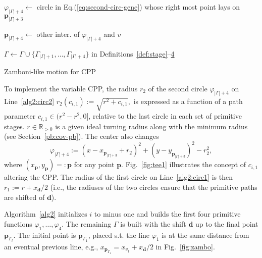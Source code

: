 \documentclass[letterpaper,10pt,journal,twoside]{IEEEtran}
\theoremstyle{definition}
\begin{document}
\begin{algorithm}[t]
\begin{algorithmic}[1]
          \STATE $\varphi_{|\Gamma|+4}\gets$ circle in Eq.\hspace*{.7ex}(\ref{eq:second-circ-gene}) 
          whose right most point lays\vspace*{.3ex} \hspace*{1em}on $\mathbf{p}_{|\Gamma|+3}$\vspace*{.3ex}\label{alg2:circ2}

          \STATE $\mathbf{p}_{|\Gamma|+4}\gets$ other inter. %
          of $\varphi_{|\Gamma|+4}$ and $v$\vspace*{.3ex}\label{alg2:trig4}

          \vspace*{.8ex}
          \STATE $\Gamma\gets\Gamma\cup\{\Gamma_{|\Gamma|+1},\dots,\Gamma_{|\Gamma|+4}\}${ in Definitions~\ref{def:stage}--\hyperref[def:plan]{4}}\label{alg2:last}

        \ENDIF
      \ENDIF
    \ENDFOR
  \end{algorithmic}
  \caption{Zamboni-like motion for CPP}\label{alg2}
\end{algorithm}

To implement the variable CPP, the radius $r_2$ of the second circle $\varphi_{|\Gamma|+4}$ on Line~\ref{alg2:circ2}
  $r_2(c_{i,1}):=\sqrt{r^2+c_{i,1}},$ 
is expressed as a function of a path parameter $c_{i,1}\in(\underline{r}^2-r^2,0]$, relative to the last circle in each set of primitive stages. $r\in\mathbb{R}_{>0}$ is a given ideal turning radius along with the minimum radius (see Section~\ref{pb:cov-pb}). The center also changes
\begin{equation}\label{eq:second-circ-gene}
  \varphi_{|\Gamma|+4}:=(x-x_{\mathbf{p}_{|\Gamma|+3}}+r_2)^2+(y-y_{\mathbf{p}_{|\Gamma|+3}})^2-r_2^2,
\end{equation}
where $(x_\mathbf{p},y_\mathbf{p})=:\mathbf{p}$ for any point $\mathbf{p}$. Fig.~\ref{fig:tee1} illustrates the concept of $c_{i,1}$ altering the CPP. The radius of the first circle on Line~\ref{alg2:circ1} is then $r_1:=r+x_\mathbf{d}/2$ (i.e., the radiuses of the two circles ensure that the primitive paths are shifted of $\mathbf{d}$).%

Algorithm~\ref{alg2} initializes $i$ to minus one and builds the first four primitive functions $\varphi_1,\dots,\varphi_4$. The remaining $\Gamma$ is built with the shift $\mathbf{d}$ up to the final point $\mathbf{p}_{\Gamma_l}$. The initial point is $\mathbf{p}_{\Gamma_1}$, placed s.t. the line $\varphi_1$ is at the same distance from an eventual previous line, e.g., $x_{\mathbf{p}_{\Gamma_1}}=x_{v_1}+x_{\mathbf{d}}/2$ in Fig.~\ref{fig:zambo}.
\end{document}
